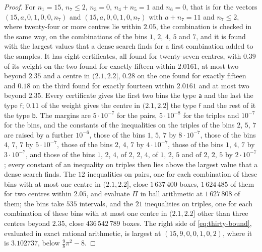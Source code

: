\documentclass[11pt,reqno]{amsart}
\renewcommand{\_}{\origunderscore\allowbreak}
\numberwithin{equation}{section}
\theoremstyle{plain}
\theoremstyle{definition}
\theoremstyle{remark}
\begin{document}
\begin{proof}
For $n_1=15$, $n_7\le2$, $n_3=0$, $n_4+n_5=1$ and $n_6=0$, that is for the
vectors $(15,a,0,1,0,0,n_7)$ and $(15,a,0,0,1,0,n_7)$ with $a+n_7=11$ and
$n_7\le2$, where twenty-four or more centres lie within $2.05$, the
combination is checked in the same way, on the combinations of the bins
$1$, $2$, $4$, $5$ and $7$, and it is found with the largest values that a
dense search finds for a first combination added to the samples. It has
eight certificates, all found for twenty-seven centres, with $0.39$ of its
weight on the two found for exactly fifteen within $2.0161$, at most two
beyond $2.35$ and a centre in $(2.1,2.2]$, $0.28$ on the one found for
exactly fifteen and $0.18$ on the third found for exactly fourteen within
$2.0161$ and at most two beyond $2.35$. Every certificate gives the first
two bins the type $\mathsf a$ and the last the type $\mathsf f$; $0.11$ of
the weight gives the centre in $(2.1,2.2]$ the type $\mathsf f$ and the
rest of it the type $\mathsf b$. The margins are $5\cdot10^{-7}$ for the
pairs, $5\cdot10^{-8}$ for the triples and $10^{-7}$ for the bins, and the
constants of the inequalities on the triples of the bins $2$, $5$, $7$ are
raised by a further $10^{-6}$, those of the bins $1$, $5$, $7$ by
$8\cdot10^{-7}$, those of the bins $4$, $7$, $7$ by $5\cdot10^{-7}$, those
of the bins $2$, $4$, $7$ by $4\cdot10^{-7}$, those of the bins $1$, $4$,
$7$ by $3\cdot10^{-7}$, and those of the bins $1$, $2$, $4$, of $2$, $2$,
$4$, of $1$, $2$, $5$ and of $2$, $2$, $5$ by $2\cdot10^{-7}$; every
constant of an inequality on triples then lies above the largest value
that a dense search finds. The $12$ inequalities on pairs, one for each
combination of these bins with at most one centre in $(2.1,2.2]$, close
$1\,637\,400$ boxes, $1\,624\,485$ of them for two centres within $2.05$,
and evaluate $\Pi$ in ball arithmetic at $1\,627\,808$ of them; the bins
take $535$ intervals, and the $21$ inequalities on triples, one for each
combination of these bins with at most one centre in $(2.1,2.2]$ other
than three centres beyond $2.35$, close $436\,542\,789$ boxes. The right
side of \eqref{eq:thirty-bound}, evaluated in exact rational arithmetic,
is largest at $(15,9,0,0,1,0,2)$, where it is $3.102737$, below
$\frac98\pi^2-8$.


\end{proof}
\end{document}
